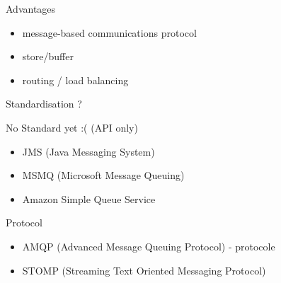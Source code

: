{  \begin{frame}
    \begin{block}{Advantages}
      \begin{itemize}
        \item message-based communications protocol
        \item store/buffer
        \item routing / load balancing
      \end{itemize}
    \end{block}
  \end{frame}

  \begin{frame}{Standardisation ?}
    \begin{block}{No Standard yet :( (API only) }
      \begin{itemize}
        \item JMS (Java Messaging System)
        \item MSMQ (Microsoft Message Queuing)
        \item Amazon Simple Queue Service
      \end{itemize}
    \end{block}

    \begin{block}{Protocol}
      \begin{itemize}
        \item AMQP (Advanced Message Queuing Protocol) - protocole
        \item STOMP (Streaming Text Oriented Messaging Protocol)
      \end{itemize}
    \end{block}
 \end{frame}
}


